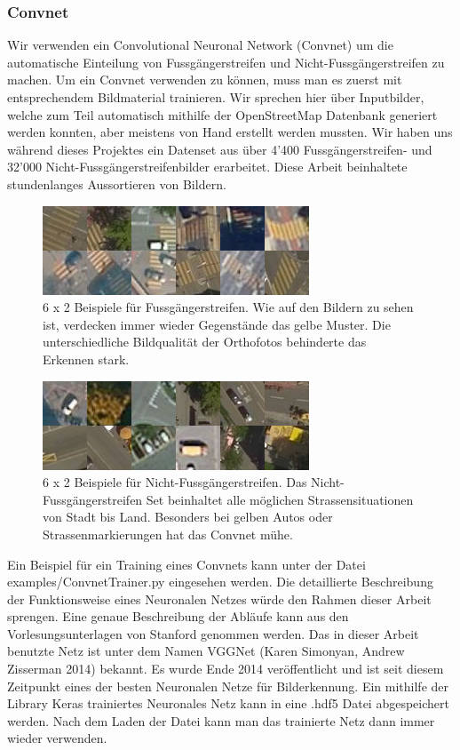 \subsubsection{Convnet}
Wir verwenden ein Convolutional Neuronal Network (Convnet) um die automatische Einteilung von Fussgängerstreifen und Nicht-Fussgängerstreifen zu machen. Um ein Convnet verwenden zu können, muss man es zuerst mit entsprechendem Bildmaterial trainieren. Wir sprechen hier über Inputbilder, welche zum Teil automatisch mithilfe der OpenStreetMap Datenbank generiert werden konnten, aber meistens von Hand erstellt werden mussten. Wir haben uns während dieses Projektes ein Datenset aus über 4'400 Fussgängerstreifen- und 32'000 Nicht-Fussgängerstreifenbilder erarbeitet. Diese Arbeit beinhaltete stundenlanges Aussortieren von Bildern.
\\

\begin{figure}[H]
	\centering
	\includegraphics{images/Zebrastreifen_examples.png}
	\caption[Beispiele für Fussgängerstreifen]{6 x 2 Beispiele für Fussgängerstreifen. Wie auf den Bildern zu sehen ist, verdecken immer wieder Gegenstände das gelbe Muster. Die unterschiedliche Bildqualität der Orthofotos behinderte das Erkennen stark.}
\end{figure}

\begin{figure}[H]
	\centering
	\includegraphics{images/No_Zebrastreifen_examples.png}
	\caption[Beispiele für Nicht-Fussgängerstreifen]{6 x 2 Beispiele für Nicht-Fussgängerstreifen. Das Nicht-Fussgängerstreifen Set beinhaltet alle möglichen Strassensituationen von Stadt bis Land. Besonders bei gelben Autos oder Strassenmarkierungen hat das Convnet mühe.}
\end{figure}

Ein Beispiel für ein Training eines Convnets kann unter der Datei examples/ConvnetTrainer.py eingesehen werden. Die detaillierte Beschreibung der Funktionsweise eines Neuronalen Netzes würde den Rahmen dieser Arbeit sprengen. Eine genaue Beschreibung der Abläufe kann aus den Vorlesungsunterlagen von Stanford \cite{Convolutional} genommen werden. Das in dieser Arbeit benutzte Netz ist unter dem Namen VGGNet (Karen Simonyan, Andrew Zisserman 2014)\cite{Deep} bekannt. Es wurde Ende 2014 veröffentlicht und ist seit diesem Zeitpunkt eines der besten Neuronalen Netze für Bilderkennung. Ein mithilfe der Library Keras trainiertes Neuronales Netz kann in eine .hdf5 Datei abgespeichert werden. Nach dem Laden der Datei kann man das trainierte Netz dann immer wieder verwenden.

